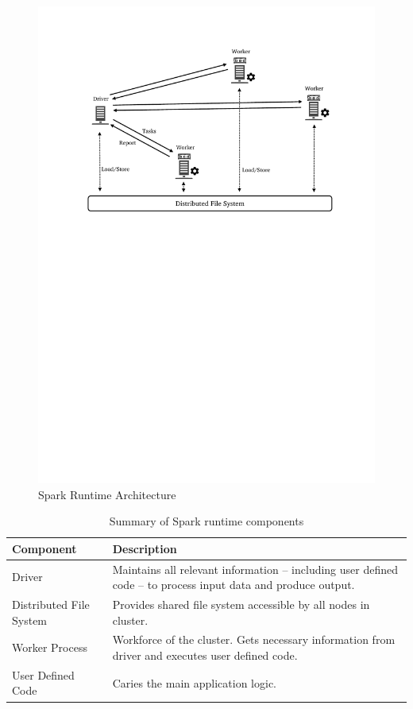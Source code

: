 \begin{figure}[h]
    \centering
    \includegraphics[clip,trim=3cm 16.8cm 2.5cm 2.5cm]{spark-high.pdf}
    \caption[Spark Runtime Architecture]{Spark Runtime Architecture}
    \label{fig:spark-runtime}
\end{figure}
\begin{table}[ht]
    \begin{tabularx}{\textwidth}{lX}
        \toprule
        \textbf{Component} & \textbf{Description}\\
        \midrule
        Driver & Maintains all relevant information -- including user defined code -- to process input data and produce output.\\
        Distributed File System & Provides shared file system accessible by all nodes in cluster.\\
        Worker Process & Workforce of the cluster. Gets necessary information from driver and executes user defined code.\\
        User Defined Code & Caries the main application logic.\\
        \bottomrule
    \end{tabularx}
    \centering
    \caption{Summary of Spark runtime components}
    \label{tab:spark-runtime}
\end{table}


